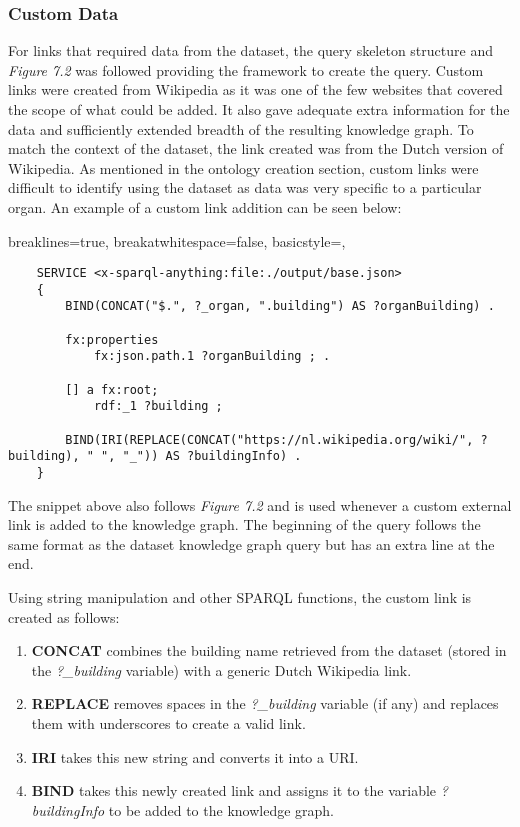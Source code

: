 \subsubsection{Custom Data}
\hspace*{0.5cm} For links that required data from the dataset, the query skeleton structure and \textit{Figure 7.2} was followed providing the framework to create the query. Custom links were created from Wikipedia as it was one of the few websites that covered the scope of what could be added. It also gave adequate extra information for the data and sufficiently extended breadth of the resulting knowledge graph. To match the context of the dataset, the link created was from the Dutch version of Wikipedia. As mentioned in the ontology creation section, custom links were difficult to identify using the dataset as data was very specific to a particular organ. An example of a custom link addition can be seen below:

\lstset
{
    breaklines=true,
    breakatwhitespace=false,
    basicstyle=\ttfamily,
}
\begin{lstlisting}
    SERVICE <x-sparql-anything:file:./output/base.json>
    {
        BIND(CONCAT("$.", ?_organ, ".building") AS ?organBuilding) .
    
        fx:properties
            fx:json.path.1 ?organBuilding ; .
    
        [] a fx:root; 
            rdf:_1 ?building ;
    
        BIND(IRI(REPLACE(CONCAT("https://nl.wikipedia.org/wiki/", ?building), " ", "_")) AS ?buildingInfo) . 
    } 
\end{lstlisting}

The snippet above also follows \textit{Figure 7.2} and is used whenever a custom external link is added to the knowledge graph. The beginning of the query follows the same format as the dataset knowledge graph query but has an extra line at the end.

Using string manipulation and other SPARQL functions, the custom link is created as follows:
\begin{enumerate}
    \item \textbf{CONCAT} combines the building name retrieved from the dataset (stored in the \textit{?\_building} variable) with a generic Dutch Wikipedia link.
    \item \textbf{REPLACE} removes spaces in the \textit{?\_building} variable (if any) and replaces them with underscores to create a valid link. 
    \item \textbf{IRI} takes this new string and converts it into a URI.
    \item \textbf{BIND} takes this newly created link and assigns it to the variable \textit{?buildingInfo} to be added to the knowledge graph. 
\end{enumerate}

